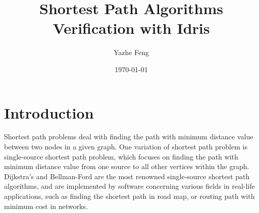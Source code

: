 \documentclass[11pt, a4paper]{article} %
\title{Shortest Path Algorithms Verification with Idris} %
\author{
Yazhe Feng %
  }
\date{\small \today} %
\theoremstyle{definition}
\begin{document}


%

\maketitle %


\setcounter{page}{1} %

\section{Introduction} %
Shortest path problems deal with finding the path with minimum distance value between two nodes in a given graph. One variation of shortest path problem is single-source shortest path problem, which focuses on finding the path with minimum distance value from one source to all other vertices within the graph. Dijkstra's and Bellman-Ford are the most renowned single-source shortest path algorithms, and are implemented by software concerning various fields in real-life applications, such as finding the shortest path in road map, or routing path with minimum cost in networks. 
\\
\end{document}
